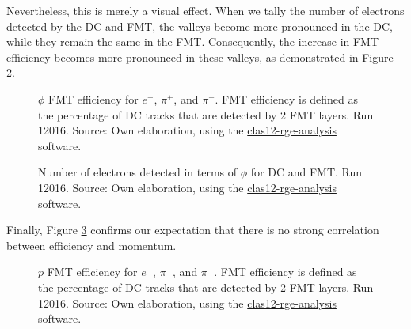     Nevertheless, this is merely a visual effect.
    When we tally the number of electrons detected by the DC and FMT, the valleys become more pronounced in the DC, while they remain the same in the FMT.
    Consequently, the increase in FMT efficiency becomes more pronounced in these valleys, as demonstrated in Figure \ref{fig::14.14::phi_geomcut}.

    \begin{figure}[t!]
        \centering{}
        \caption[$\phi$ FMT efficiency for $e^-$, $\pi^+$, and $\pi^-$.
        Run 12016]{$\phi$ FMT efficiency for $e^-$, $\pi^+$, and $\pi^-$.
        FMT efficiency is defined as the percentage of DC tracks that are detected by 2 FMT layers.
        Run 12016.
        Source: Own elaboration, using the \hyperlink{github.com/bleaktwig/clas12-rge-analysis}{clas12-rge-analysis} software.}
        \label{fig::14.14::fmt_efficiency_phi}
    \end{figure}

    \begin{figure}[t!]
        \centering{}
        \caption[Number of electrons detected in terms of $\phi$ for DC and FMT efficiencies for $e^-$.
        Run 12016]{Number of electrons detected in terms of $\phi$ for DC and FMT.
        Run 12016.
        Source: Own elaboration, using the \hyperlink{github.com/bleaktwig/clas12-rge-analysis}{clas12-rge-analysis} software.}
        \label{fig::14.14::phi_geomcut}
    \end{figure}

    Finally, Figure \ref{fig::14.14::fmt_efficiency_p} confirms our expectation that there is no strong correlation between efficiency and momentum.

    \begin{figure}[b!]
        \centering{}
        \caption[$p$ FMT efficiency for $e^-$, $\pi^+$, and $\pi^-$.
        Run 12016]{$p$ FMT efficiency for $e^-$, $\pi^+$, and $\pi^-$.
        FMT efficiency is defined as the percentage of DC tracks that are detected by 2 FMT layers.
        Run 12016.
        Source: Own elaboration, using the \hyperlink{github.com/bleaktwig/clas12-rge-analysis}{clas12-rge-analysis} software.}
        \label{fig::14.14::fmt_efficiency_p}
    \end{figure}
